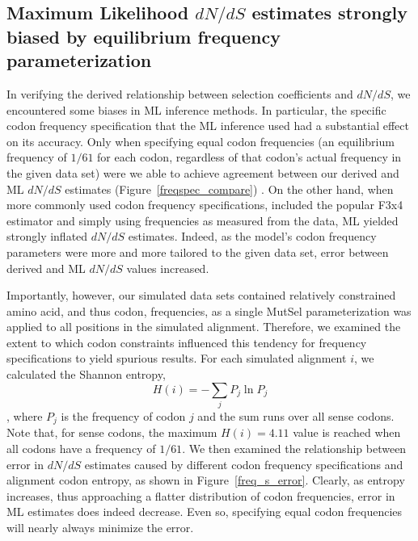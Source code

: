 \documentclass[11pt]{article}
\begin{document}
\subsection*{Maximum Likelihood $dN/dS$ estimates strongly biased by equilibrium frequency parameterization}

In verifying the derived relationship between selection coefficients and $dN/dS$, we encountered some biases in ML inference methods. In particular, the specific codon frequency specification that the ML inference used had a substantial effect on its accuracy. Only when specifying equal codon frequencies (an equilibrium frequency of $1/61$ for each codon, regardless of that codon's actual frequency in the given data set) were we able to achieve agreement between our derived and ML $dN/dS$ estimates (Figure~\ref{freqspec_compare}) . On the other hand, when more commonly used codon frequency specifications, included the popular F3x4 estimator and simply using frequencies as measured from the data, ML yielded strongly inflated $dN/dS$ estimates. Indeed, as the model's codon frequency parameters were more and more tailored to the given data set, error between derived and ML $dN/dS$ values increased.

Importantly, however, our simulated data sets contained relatively constrained amino acid, and thus codon, frequencies, as a single MutSel  parameterization was applied to all positions in the simulated alignment. Therefore, we examined the extent to which codon constraints influenced this tendency for frequency specifications to yield spurious results. For each simulated alignment $i$, we calculated the Shannon entropy, \begin{equation} H(i) = - \sum_j P_j \ln P_j \end{equation}, where $P_j$ is the frequency of codon $j$ and the sum runs over all sense codons. Note that, for sense codons, the maximum $H(i) = 4.11$ value is reached when all codons have a frequency of $1/61$. We then examined the relationship between error in $dN/dS$ estimates caused by different codon frequency specifications and alignment codon entropy, as shown in Figure~\ref{freq_s_error}. Clearly, as entropy increases, thus approaching a flatter distribution of codon frequencies, error in ML estimates does indeed decrease. Even so, specifying equal codon frequencies will nearly always minimize the error.
\end{document}

